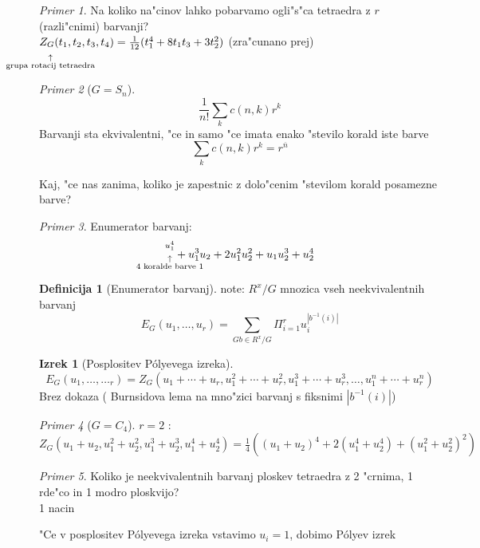 \documentclass[a4paper,12pt]{article}
\theoremstyle{definition}
\newtheorem{defn}[counter]{Definicija}
\newtheorem{theorem}[counter]{Izrek}
\theoremstyle{remark}
\newtheorem*{ex}{Primer}
\begin{document}

\begin{ex}
	Na koliko na"cinov lahko pobarvamo ogli"s"ca tetraedra z $r$ (razli"cnimi) barvanji?\\
	$Z_{\substack{G \\ \\ \uparrow \\ \mathclap{\text{grupa rotacij tetraedra}}}} (t_1,t_2,t_3,t_4) = \frac{1}{12}(t_1^4 + 8t_1t_3 + 3t_2^2)$ (zra"cunano prej)
\end{ex}


\begin{ex}[$G = S_n$]
$$ \frac{1}{n!}\sum_k c(n,k) r^k $$
Barvanji sta ekvivalentni, "ce in samo "ce imata enako "stevilo korald iste barve
\label{Idk kko smo prsli do tega}
$$ \sum_k c(n,k) r^k = r^{\overline{n}} $$
\end{ex}

Kaj, "ce nas zanima, koliko je zapestnic z dolo"cenim "stevilom korald posamezne barve?
\begin{ex}
	Enumerator barvanj: $$\substack{u_1^4 \\ \\ \uparrow \\ \mathclap{\text{4 koralde barve 1}}} + u_1^3u_2 + 2u_1^2u_2^2+u_1u_2^3+u_2^4 $$
\end{ex}
\begin{defn}[Enumerator barvanj]
	note: $R^x/G$ mnozica vseh neekvivalentnih barvanj
	$$ E_G(u_1, \ldots, u_r) = \sum_{Gb \in R^x/G} \Pi_{i=1}^r u_i^{ |b^{-1}(i)| } $$
\end{defn}

\begin{theorem}[Posplositev P\'{o}lyevega izreka]
	$$ E_G(u_1, \ldots, \ldots_r) = Z_G(u_1 + \cdots + u_r, u^2_1 + \cdots + u^2_r, u^3_1 + \cdots + u^3_r, \ldots, u^n_1 + \cdots + u^n_r) $$
	Brez dokaza ( Burnsidova lema na mno"zici barvanj s fiksnimi $| b^{-1}(i) | $)
\end{theorem}

\begin{ex}[$G = C_4$]
	$r = 2$ : $Z_G(u_1 + u_2, u^2_1 + u^2_2, u^3_1 + u^3_2, u^4_1 + u^4_2) = \frac{1}{4}\left((u_1 + u_2)^4 + 2(u^4_1 + u^4_2) + (u^2_1 + u^2_2)^2 \right) $
\end{ex}
\begin{ex}
	Koliko je neekvivalentnih barvanj ploskev tetraedra z 2 "crnima, 1 rde"co in 1 modro ploskvijo? \\
	1 nacin
\end{ex}

"Ce v posplositev P\'{o}lyevega izreka vstavimo $u_i = 1$, dobimo P\'{o}lyev izrek
\end{document}
